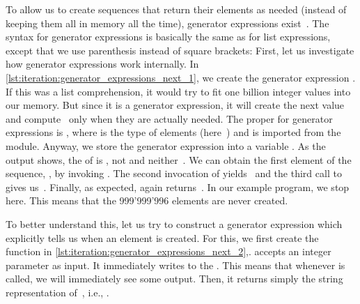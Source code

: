 To allow us to create  sequences that return their elements as needed (instead of keeping them all in memory all the time), generator expressions exist~\cite{PEP289}.
The syntax for generator expressions is basically the same as for list expressions, except that we use parenthesis instead of square brackets:%
%
%
%
%
%
%
First, let us investigate how generator expressions work internally.
In \cref{lst:iteration:generator_expressions_next_1}, we create the generator expression .
If this was a list comprehension, it would try to fit one billion integer values into our memory.
But since it is a generator expression, it will create the next value~ and compute~ only when they are actually needed.
The proper  for generator expressions is , where  is the type of elements (here~) and  is imported from the  module.
Anyway, we store the generator expression into a variable .
As the output shows, the  of  is , not  and neither~.
We can obtain the first element of the sequence, , by invoking .
The second invocation of  yields~ and the third call to  gives us~.
Finally, as expected,  again returns~.
In our example program, we stop here.
This means that the 999'999'996 elements are never created.

%
%
\afterpage{\clearpage}%
%
To better understand this, let us try to construct a generator expression which explicitly tells us when an element is created.
For this, we first create the function  in \cref{lst:iteration:generator_expressions_next_2},.
 accepts an integer parameter  as input.
It immediately writes  to the .
This means that whenever  is called, we will immediately see some output.
Then, it returns simply the string representation of~, i.e., .

